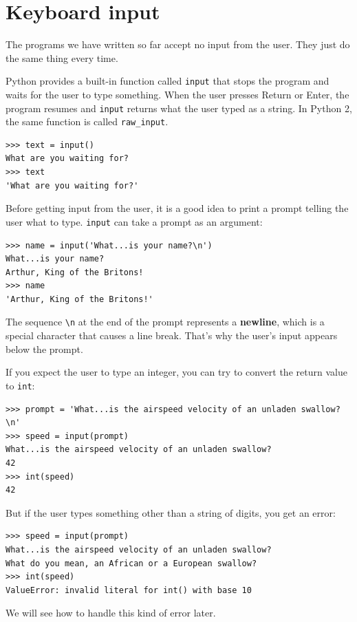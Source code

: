 \documentclass[10pt]{book}
\begin{document}
\section{Keyboard input}

The programs we have written so far accept no input from the user.
They just do the same thing every time.

Python provides a built-in function called {\tt input} that
stops the program and
waits for the user to type something.  When the user presses {\sf
  Return} or {\sf Enter}, the program resumes and \verb"input"
returns what the user typed as a string.  In Python 2, the same
function is called \verb"raw_input".

\begin{verbatim}
>>> text = input()
What are you waiting for?
>>> text
'What are you waiting for?'
\end{verbatim}
%
Before getting input from the user, it is a good idea to print a
prompt telling the user what to type.  \verb"input" can take a
prompt as an argument:

\begin{verbatim}
>>> name = input('What...is your name?\n')
What...is your name?
Arthur, King of the Britons!
>>> name
'Arthur, King of the Britons!'
\end{verbatim}
%
The sequence \verb"\n" at the end of the prompt represents a {\bf
  newline}, which is a special character that causes a line break.
That's why the user's input appears below the prompt.  

If you expect the user to type an integer, you can try to convert
the return value to {\tt int}:

\begin{verbatim}
>>> prompt = 'What...is the airspeed velocity of an unladen swallow?\n'
>>> speed = input(prompt)
What...is the airspeed velocity of an unladen swallow?
42
>>> int(speed)
42
\end{verbatim}
%
But if the user types something other than a string of digits,
you get an error:

\begin{verbatim}
>>> speed = input(prompt)
What...is the airspeed velocity of an unladen swallow?
What do you mean, an African or a European swallow?
>>> int(speed)
ValueError: invalid literal for int() with base 10
\end{verbatim}
%
We will see how to handle this kind of error later.
\end{document}
